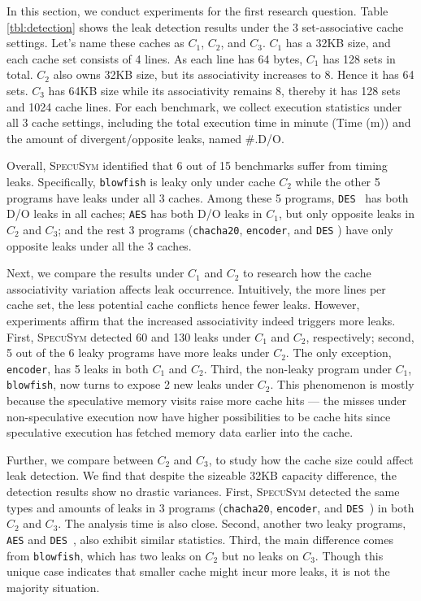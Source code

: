 \documentclass[sigconf,screen]{acmart}
\newcommand{\SpecuSym}{\textsc{SpecuSym} }
\begin{document}
In this section, we conduct experiments for the first research question. Table
\ref{tbl:detection} shows the leak detection results under the 3 set-associative 
cache settings. Let's name these caches as {$C_1$}, $C_2$, and $C_3$. $C_1$ has 
a 32KB size, and each cache set consists of 4 lines. As each line has 64 bytes, 
$C_1$ has 128 sets in total. $C_2$ also owns 32KB size, but its associativity 
increases to 8. Hence it has 64 sets. $C_3$ has 64KB size while its associativity 
remains 8, thereby it has 128 sets and 1024 cache lines. For each benchmark, we 
collect execution statistics under all 3 cache settings, including the total 
execution time in minute (Time (m)) and the amount of divergent/opposite leaks,
named \#.D/O. 


Overall, \SpecuSym identified that 6 out of 15 benchmarks suffer from timing 
leaks. Specifically, \texttt{blowfish} is leaky only under cache $C_2$ while 
the other 5 programs have leaks under all 3 caches. Among these 5 programs, 
\texttt{DES}~\cite{glibc} has both D/O leaks in all caches; \texttt{AES} has 
both D/O leaks in $C_1$, but only opposite leaks in $C_2$ and $C_3$; and the 
rest 3 programs (\texttt{chacha20}, \texttt{encoder}, and \texttt{DES}
\cite{OpenSSL111c}) have only opposite leaks under all the 3 caches.





Next, we compare the results under $C_1$ and $C_2$ to research how the cache 
associativity variation affects leak occurrence. Intuitively, the more lines 
per cache set, the less potential cache conflicts hence fewer leaks. However, 
experiments affirm that the increased associativity indeed triggers more leaks. 
First, \SpecuSym detected 60 and 130 leaks under $C_1$ and $C_2$, respectively; 
second, 5 out of the 6 leaky programs have more leaks under $C_2$. The only 
exception, \texttt{encoder}, has 5 leaks in both $C_1$ and $C_2$. Third, the 
non-leaky program under $C_1$, \texttt{blowfish}, now turns to expose 2 new 
leaks under $C_2$. This phenomenon is mostly because the speculative memory 
visits raise more cache hits --- the misses under non-speculative execution 
now have higher possibilities to be cache hits since speculative execution has
fetched memory data earlier into the cache. 


Further, we compare between $C_2$ and $C_3$, to study how the cache size could 
affect leak detection. We find that despite the sizeable 32KB capacity 
difference, the detection results show no drastic variances. First, \SpecuSym 
detected the same types and amounts of leaks in 3 programs (\texttt{chacha20}, 
\texttt{encoder}, and \texttt{DES}~\cite{OpenSSL111c}) in both $C_2$ and $C_3$. 
The analysis time is also close. Second, another two leaky programs, \texttt{AES} 
and \texttt{DES}~\cite{glibc}, also exhibit similar statistics. Third, the main 
difference comes from \texttt{blowfish}, which has two leaks on $C_2$ but no 
leaks on $C_3$. Though this unique case indicates that smaller cache might 
incur more leaks, it is not the majority situation. 
\end{document}
